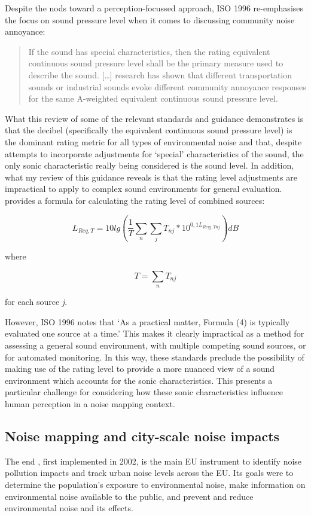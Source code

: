Despite the nods toward a perception-focussed approach, ISO 1996 re-emphasises the focus on sound pressure level when it comes to discussing community noise annoyance\citep[Sec. 6.1]{ISO1996Part1}:

\begin{quote}
  If the sound has special characteristics, then the rating equivalent continuous sound pressure level shall be the primary measure used to describe the sound. [\dots] research has shown that different transportation sounds or industrial sounds evoke different community annoyance responses for the same A-weighted equivalent continuous sound pressure level.
\end{quote}

What this review of some of the relevant standards and guidance demonstrates is that the decibel (specifically the equivalent continuous sound pressure level) is the dominant rating metric for all types of environmental noise and that, despite attempts to incorporate adjustments for `special' characteristics of the sound, the only sonic characteristic really being considered is the sound level. In addition, what my review of this guidance reveals is that the rating level adjustments are impractical to apply to complex sound environments for general evaluation. \citet[Eq. 4]{ISO1996Part1} provides a formula for calculating the rating level of combined sources:

$$
L_{Req,T} = 10lg \left(\frac{1}{T} \sum_n \sum_j T_{nj} * 10^{0,1L_{Reqj,Tnj}}  \right) dB
$$

where

$$
T = \sum_n T_{nj}
$$

for each source \emph{j}.

However, ISO 1996 notes that `As a practical matter, Formula (4) is typically evaluated one source at a time.' This makes it clearly impractical as a method for assessing a general sound environment, with multiple competing sound sources, or for automated monitoring. In this way, these standards preclude the possibility of making use of the rating level to provide a more nuanced view of a sound environment which accounts for the sonic characteristics. This presents a particular challenge for considering how these sonic characteristics influence human perception in a noise mapping context. 

\subsection{Noise mapping and city-scale noise impacts}
The \gls{end} \citep{Directive200249ECEuropeanUniEuropean}, first implemented in 2002, is the main EU instrument to identify noise pollution impacts and track urban noise levels across the EU. Its goals were to determine the population's exposure to environmental noise, make information on environmental noise available to the public, and prevent and reduce environmental noise and its effects. 

